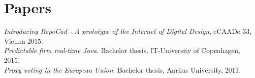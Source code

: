 \documentclass[12pt,a4paper,notitlepage]{article}
\begin{document}
\section*{Papers}
\textit{Introducing RepoCad  - A prototype of the Internet of Digital Design}, eCAADe 33, Vienna 2015. \\
\textit{Predictable firm real-time Java}. Bachelor thesis, IT-University of Copenhagen, 2015. \\
\textit{Proxy voting in the European Union}. Bachelor thesis, Aarhus University, 2011.

\end{document}
